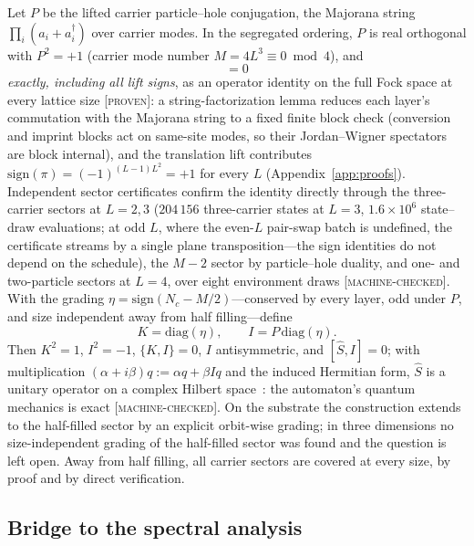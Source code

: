 \documentclass[aps,prd,twocolumn,superscriptaddress,nofootinbib,floatfix]{revtex4-2}
\newcommand{\evP}{\textnormal{\textsc{[proven]}}}
\newcommand{\evM}{\textnormal{\textsc{[machine-checked]}}}
\begin{document}
Let $P$ be the lifted carrier particle--hole conjugation, the Majorana
string $\prod_i(a_i+a_i^\dagger)$ over carrier modes. In the segregated
ordering, $P$ is real orthogonal with $P^2=+1$ (carrier mode number
$M=4L^3\equiv0 \bmod 4$), and
\begin{equation}
[\hat S, P]=0
\end{equation}
\emph{exactly, including all lift signs}, as an operator identity on the
full Fock space at every lattice size \evP{}: a string-factorization
lemma reduces each layer's commutation with the Majorana string to a
fixed finite block check (conversion and imprint blocks act on same-site
modes, so their Jordan--Wigner spectators are block internal), and the
translation lift contributes
$\mathrm{sign}(\pi)=(-1)^{(L-1)L^2}=+1$ for every $L$
(Appendix~\ref{app:proofs}). Independent sector certificates confirm the
identity directly through the three-carrier sectors at $L=2,3$
($204\,156$ three-carrier states at $L=3$, $1.6\times10^6$
state--draw evaluations; at odd $L$, where the even-$L$ pair-swap
batch is undefined, the certificate streams by a single plane
transposition---the sign identities do not depend on the
schedule), the $M{-}2$ sector by
particle--hole duality, and one- and two-particle sectors at $L=4$, over
eight environment draws \evM{}. With the grading $\eta=\mathrm{sign}(N_c-M/2)$---conserved
by every layer, odd under $P$, and size independent away from half
filling---define
\begin{equation}
K=\mathrm{diag}(\eta), \qquad I = P\,\mathrm{diag}(\eta).
\end{equation}
Then $K^2=1$, $I^2=-1$, $\{K,I\}=0$, $I$ antisymmetric, and $[\hat S,I]=0$;
with multiplication $(\alpha+i\beta)q:=\alpha q+\beta Iq$ and the induced
Hermitian form, $\hat S$ is a unitary operator on a complex Hilbert
space~\cite{Wetterich2022}: the automaton's quantum mechanics is exact
\evM{}. On the substrate the construction extends to the half-filled sector
by an explicit orbit-wise grading; in three dimensions no size-independent
grading of the half-filled sector was found and the question is left open.
Away from half filling, all carrier sectors are covered at every size, by
proof and by direct verification.

\subsection{Bridge to the spectral analysis}
\end{document}
